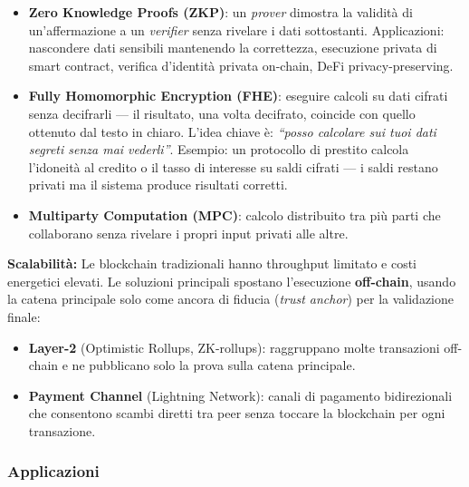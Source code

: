 \documentclass[
  italian,
  openany]{book}
\providecommand{\tightlist}{%
  \setlength{\itemsep}{0pt}\setlength{\parskip}{0pt}}
\begin{document}
\begin{itemize}
\tightlist
\item
  \textbf{Zero Knowledge Proofs (ZKP)}: un \emph{prover} dimostra la
  validità di un'affermazione a un \emph{verifier} senza rivelare i dati
  sottostanti. Applicazioni: nascondere dati sensibili mantenendo la
  correttezza, esecuzione privata di smart contract, verifica d'identità
  privata on-chain, DeFi privacy-preserving.
\item
  \textbf{Fully Homomorphic Encryption (FHE)}: eseguire calcoli su dati
  cifrati senza decifrarli --- il risultato, una volta decifrato,
  coincide con quello ottenuto dal testo in chiaro. L'idea chiave è:
  \emph{``posso calcolare sui tuoi dati segreti senza mai vederli''}.
  Esempio: un protocollo di prestito calcola l'idoneità al credito o il
  tasso di interesse su saldi cifrati --- i saldi restano privati ma il
  sistema produce risultati corretti.
\item
  \textbf{Multiparty Computation (MPC)}: calcolo distribuito tra più
  parti che collaborano senza rivelare i propri input privati alle
  altre.
\end{itemize}

\textbf{Scalabilità:} Le blockchain tradizionali hanno throughput
limitato e costi energetici elevati. Le soluzioni principali spostano
l'esecuzione \textbf{off-chain}, usando la catena principale solo come
ancora di fiducia (\emph{trust anchor}) per la validazione finale:

\begin{itemize}
\tightlist
\item
  \textbf{Layer-2} (Optimistic Rollups, ZK-rollups): raggruppano molte
  transazioni off-chain e ne pubblicano solo la prova sulla catena
  principale.
\item
  \textbf{Payment Channel} (Lightning Network): canali di pagamento
  bidirezionali che consentono scambi diretti tra peer senza toccare la
  blockchain per ogni transazione.
\end{itemize}

\subsubsection{Applicazioni}\label{applicazioni}
\end{document}
